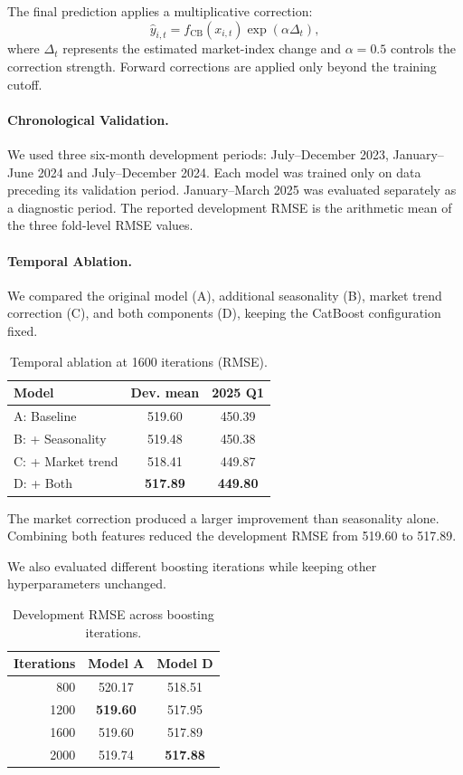 \documentclass[10pt,a4paper]{article}
\begin{document}
The final prediction applies a multiplicative correction:
\begin{equation}
\hat{y}_{i,t}
=
f_{\mathrm{CB}}(x_{i,t})
\exp(\alpha\Delta_t),
\end{equation}
where $\Delta_t$ represents the estimated market-index change and $\alpha=0.5$ controls the correction strength. Forward corrections are applied only beyond the training cutoff.

\paragraph{Chronological Validation.}
We used three six-month development periods: July--December 2023, January--June 2024 and July--December 2024. Each model was trained only on data preceding its validation period. January--March 2025 was evaluated separately as a diagnostic period. The reported development RMSE is the arithmetic mean of the three fold-level RMSE values.

\paragraph{Temporal Ablation.}
We compared the original model (A), additional seasonality (B), market trend correction (C), and both components (D), keeping the CatBoost configuration fixed.

\begin{table}[t]
\centering
\caption{Temporal ablation at 1600 iterations (RMSE).}
\label{tab:f1_temporal}
\small
\begin{tabular}{lcc}
\hline
Model & Dev. mean & 2025 Q1 \\
\hline
A: Baseline & 519.60 & 450.39 \\
B: + Seasonality & 519.48 & 450.38 \\
C: + Market trend & 518.41 & 449.87 \\
D: + Both & \textbf{517.89} & \textbf{449.80} \\
\hline
\end{tabular}
\end{table}

The market correction produced a larger improvement than seasonality alone. Combining both features reduced the development RMSE from 519.60 to 517.89.

We also evaluated different boosting iterations while keeping other hyperparameters unchanged.

\begin{table}[t]
\centering
\caption{Development RMSE across boosting iterations.}
\label{tab:f1_iterations}
\small
\begin{tabular}{rcc}
\hline
Iterations & Model A & Model D \\
\hline
800  & 520.17 & 518.51 \\
1200 & \textbf{519.60} & 517.95 \\
1600 & 519.60 & 517.89 \\
2000 & 519.74 & \textbf{517.88} \\
\hline
\end{tabular}
\end{table}
\end{document}
